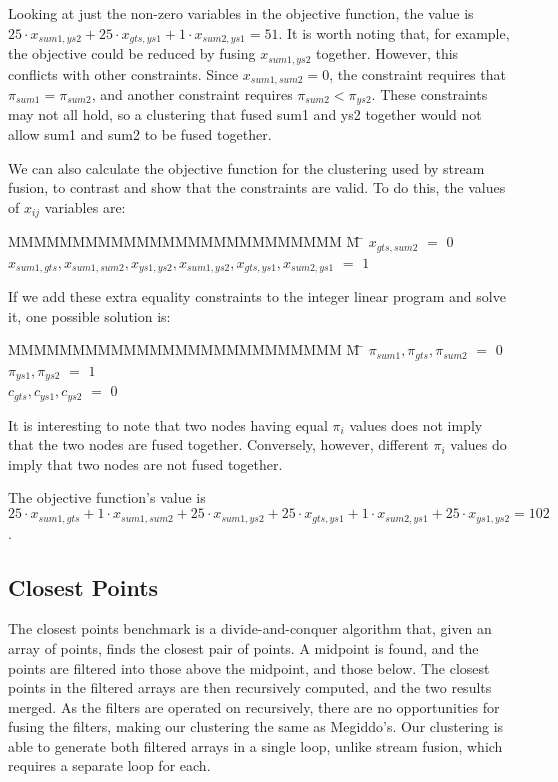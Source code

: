 Looking at just the non-zero variables in the objective function, the value is
$25 \cdot x_{sum1,ys2} + 25 \cdot x_{gts,ys1} + 1 \cdot x_{sum2, ys1} = 51$.
It is worth noting that, for example, the objective could be reduced by fusing $x_{sum1,ys2}$ together.
However, this conflicts with other constraints. Since $x_{sum1, sum2} = 0$, the constraint requires that $\pi_{sum1} = \pi_{sum2}$, and another constraint requires $\pi_{sum2} < \pi_{ys2}$.
These constraints may not all hold, so a clustering that fused sum1 and ys2 together would not allow sum1 and sum2 to be fused together.

We can also calculate the objective function for the clustering used by stream fusion, to contrast and show that the constraints are valid.
To do this, the values of $x_{ij}$ variables are:
\begin{tabbing}
MMMMMMMMMMMMMMMMMMMMMMMMMM \= M \= \kill
$x_{gts, sum2}$
    \> $=$ \> $0$ \\
$x_{sum1, gts}, x_{sum1, sum2}, x_{ys1,  ys2}, x_{sum1, ys2}, x_{gts, ys1 }, x_{sum2, ys1}$
    \> $=$ \> $1$
\end{tabbing}
If we add these extra equality constraints to the integer linear program and solve it, one possible solution is:
\begin{tabbing}
MMMMMMMMMMMMMMMMMMMMMMMMMM \= M \= \kill
$\pi_{sum1}, \pi_{gts }, \pi_{sum2}$
    \> $=$ \> $0$ \\
$\pi_{ys1 }, \pi_{ys2 }$
    \> $=$ \> $1$ \\
$c_{gts}, c_{ys1}, c_{ys2}$           
    \> $=$ \> $0$
\end{tabbing}
It is interesting to note that two nodes having equal $\pi_i$ values does not imply that the two nodes are fused together.
Conversely, however, different $\pi_i$ values do imply that two nodes are not fused together.

The objective function's value is
$25 \cdot x_{sum1, gts} + 1 \cdot x_{sum1,sum2} + 25 \cdot x_{sum1, ys2} + 25 \cdot x_{gts, ys1} + 1 \cdot x_{sum2, ys1} + 25 \cdot x_{ys1, ys2} = 102$.

\subsection{Closest Points}
The closest points benchmark is a divide-and-conquer algorithm that, given an array of points, finds the closest pair of points.
A midpoint is found, and the points are filtered into those above the midpoint, and those below.
The closest points in the filtered arrays are then recursively computed, and the two results merged.
As the filters are operated on recursively, there are no opportunities for fusing the filters, making our clustering the same as Megiddo's.
Our clustering is able to generate both filtered arrays in a single loop, unlike stream fusion, which requires a separate loop for each.

